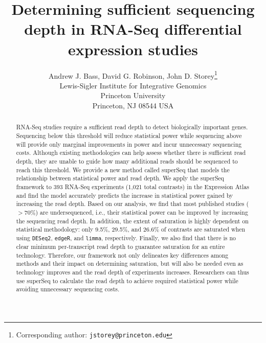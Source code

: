 \documentclass[11pt]{article}
\begin{document}
\clearpage

\title{\LARGE \bf Determining sufficient sequencing depth in RNA-Seq differential expression studies} 
\author{{\Large Andrew J. Bass, David G. Robinson, John D. Storey\thanks{Corresponding author: \texttt{jstorey@princeton.edu}}} \\ Lewis-Sigler Institute for Integrative Genomics \\ Princeton University \\ Princeton, NJ 08544 USA}
\maketitle

\begin{abstract} 
RNA-Seq studies require a sufficient read depth to detect biologically important genes. Sequencing below this threshold will reduce statistical power while sequencing above will provide only marginal improvements in power and incur unnecessary sequencing costs. Although existing methodologies can help assess whether there is sufficient read depth, they are unable to guide how many additional reads should be sequenced to reach this threshold. We provide a new method called superSeq that models the relationship between statistical power and read depth. We apply the superSeq framework to 393 RNA-Seq experiments (1,021 total contrasts) in the Expression Atlas and find the model accurately predicts the increase in statistical power gained by increasing the read depth. Based on our analysis, we find that most published studies ($>70\%$) are undersequenced, i.e., their statistical power can be improved by increasing the sequencing read depth. In addition, the extent of saturation is highly dependent on statistical methodology: only 9.5\%, 29.5\%, and 26.6\% of contrasts are saturated when using \texttt{DESeq2}, \texttt{edgeR}, and \texttt{limma}, respectively. Finally, we also find that there is no clear minimum per-transcript read depth to guarantee saturation for an entire technology. Therefore, our framework not only delineates key differences among methods and their impact on determining saturation, but will also be needed even as technology improves and the read depth of experiments increases. Researchers can thus use superSeq to calculate the read depth to achieve required statistical power while avoiding unnecessary sequencing costs.
\end{abstract}

\clearpage
\end{document}
